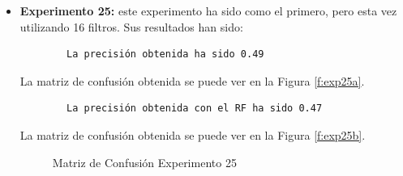 \begin{itemize}
    \item \textbf{Experimento 25:} este experimento ha sido como el primero, pero esta vez utilizando 16 filtros. Sus resultados han sido:
    \begin{verbatim}
        La precisión obtenida ha sido 0.49
    \end{verbatim}
    La matriz de confusión obtenida se puede ver en la Figura \ref{f:exp25a}.
    \begin{verbatim}
        La precisión obtenida con el RF ha sido 0.47
    \end{verbatim}
    La matriz de confusión obtenida se puede ver en la Figura \ref{f:exp25b}.
    \begin{figure}[h]
     \centering
     \caption{Matriz de Confusión Experimento 25}
     \label{f:exp25}
    \end{figure}    
    

\end{itemize}
